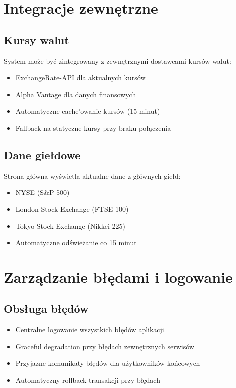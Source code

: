 \documentclass[12pt,a4paper]{article}
\begin{document}
    \section{Integracje zewnętrzne}

    \subsection{Kursy walut}
    System może być zintegrowany z zewnętrznymi dostawcami kursów walut:
    \begin{itemize}
        \item ExchangeRate-API dla aktualnych kursów
        \item Alpha Vantage dla danych finansowych
        \item Automatyczne cache'owanie kursów (15 minut)
        \item Fallback na statyczne kursy przy braku połączenia
    \end{itemize}

    \subsection{Dane giełdowe}
    Strona główna wyświetla aktualne dane z głównych giełd:
    \begin{itemize}
        \item NYSE (S\&P 500)
        \item London Stock Exchange (FTSE 100)
        \item Tokyo Stock Exchange (Nikkei 225)
        \item Automatyczne odświeżanie co 15 minut
    \end{itemize}

    \section{Zarządzanie błędami i logowanie}

    \subsection{Obsługa błędów}
    \begin{itemize}
        \item Centralne logowanie wszystkich błędów aplikacji
        \item Graceful degradation przy błędach zewnętrznych serwisów
        \item Przyjazne komunikaty błędów dla użytkowników końcowych
        \item Automatyczny rollback transakcji przy błędach
    \end{itemize}
\end{document}
